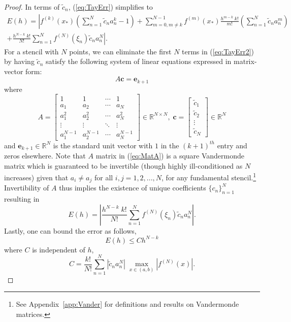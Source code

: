 \documentclass[12pt]{article}
\newcommand{\R}{\mathbb{R}}
\newcommand{\xstar}{x_*}
\begin{document}
\begin{proof}
In terms of $\tilde c_n$, (\ref{eq:TayErr}) simplifies to
\begin{equation}\label{eq:TayErr2}
\begin{split}
	E(h) = \left|
	f^{(k)}(\xstar)
        \left( \sum_{n=1}^N \tilde c_n a_n^k -1 \right) \right.
        + \sum_{m=0,m\neq k}^{N-1} f^{(m)}(\xstar) \frac{h^{m-k}\; k!}{m!}\left(\sum_{n=1}^N \tilde c_n a_n^m\right) 
        \hspace{3em}  & \\
        \left.
        + \frac{h^{N-k}\; k!}{N!}\sum_{n=1}^N f^{(N)}(\xi_n) \tilde c_n a_n^{N}
    	\right|.
\end{split}
\end{equation}
For a stencil with $N$ points, we can eliminate the first $N$ terms in (\ref{eq:TayErr2}) by having $\tilde c_n$ satisfy the following system of linear equations expressed in matrix-vector form:
\[
	A\mathbf c = \mathbf e_{k+1}
\]
where
\begin{equation}\label{eq:MatA}
	A =
	\begin{bmatrix}
		1 & 1 & \cdots & 1\\
		a_1 & a_2 & \cdots & a_N\\
		a_1^2 & a_2^2 & \cdots & a_N^2\\
		\vdots & \vdots & \ddots & \vdots\\
		a_1^{N-1} & a_2^{N-1} & \cdots & a_N^{N-1}
	\end{bmatrix} \in\R^{N\times N},
	\;
	\mathbf c = \begin{bmatrix}
		\tilde c_1\\ \tilde c_2\\ \vdots \\ \tilde c_N
	\end{bmatrix} \in\R^{N}
\end{equation}
and $\mathbf e_{k+1}\in\R^{N}$ is the standard unit vector with $1$ in the $(k+1)^{th}$ entry and zeros elsewhere.
Note that $A$ matrix in (\ref{eq:MatA}) is a square Vandermonde matrix which is guaranteed to be invertible (though highly ill-conditioned as $N$ increases) given that $a_i\neq a_j$ for all $i,j=1,2,...,N$, for any fundamental stencil.\footnote{See Appendix~\ref{app:Vander} for definitions and results on Vandermonde matrices.}
Invertibility of $A$ thus implies the existence of unique coefficients $\{c_n\}_{n=1}^N$ resulting in 
\begin{equation} \label{eq:errStand}
	E(h) = \left| 
	\frac{h^{N-k}\; k!}{N!} \sum_{n=1}^N f^{(N)}(\xi_n)\tilde c_n a_n^N
	\right|.
\end{equation}
Lastly, one can bound the error as follows,
\[
	E(h) \le Ch^{N-k}
\]
where $C$ is independent of $h$,
\[
	C = \frac{k!}{N!} \sum_{n=1}^N \left| \tilde c_n a_n^N \right| \; \max_{x\in(a,b)}\left| f^{(N)}(x) \right|.
\]
\end{proof}
\end{document}
